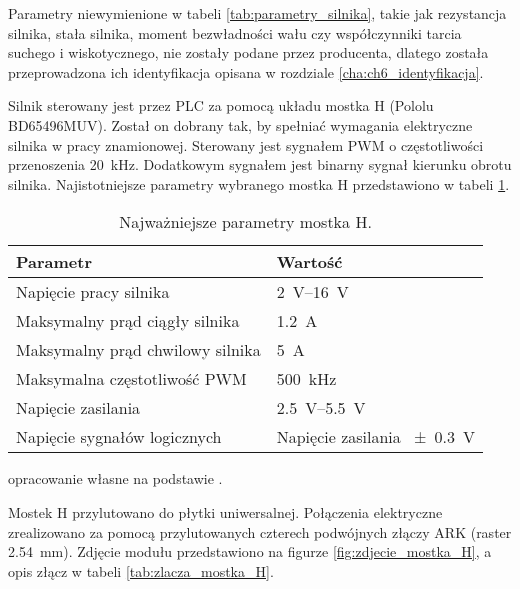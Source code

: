 Parametry niewymienione w tabeli \ref{tab:parametry_silnika}, takie jak rezystancja silnika, stała silnika, moment bezwładności wału czy współczynniki tarcia suchego i wiskotycznego, nie zostały podane przez producenta, dlatego została przeprowadzona ich identyfikacja opisana w rozdziale \ref{cha:ch6_identyfikacja}.

Silnik sterowany jest przez PLC za pomocą układu mostka H (Pololu BD65496MUV). Został on dobrany tak, by spełniać wymagania elektryczne silnika w pracy znamionowej. Sterowany jest sygnałem PWM o częstotliwości przenoszenia \SI{20}{\kilo\hertz}. Dodatkowym sygnałem jest binarny sygnał kierunku obrotu silnika. Najistotniejsze parametry wybranego mostka H przedstawiono w tabeli \ref{tab:parametry_mostka_H}.

\begin{table}[h]
    \centering
    \begin{threeparttable}
        \caption{Najważniejsze parametry mostka H.}
        \label{tab:parametry_mostka_H}
        
        \begin{tabularx}{0.7\textwidth}{l | l}
            \toprule
            Parametr & Wartość \\
            \midrule
            Napięcie pracy silnika & \SIrange{2}{16}{\volt} \\
            Maksymalny prąd ciągły silnika & \SI{1,2}{\ampere} \\
            Maksymalny prąd chwilowy silnika & \SI{5}{\ampere} \\
            Maksymalna częstotliwość PWM & \SI{500}{\kilo\hertz} \\
            Napięcie zasilania & \SIrange{2,5}{5,5}{\volt} \\
            Napięcie sygnałów logicznych & Napięcie zasilania \SI{+-0,3}{\volt} \\
            \bottomrule
        \end{tabularx}
        
        \begin{tablenotes}
            \footnotesize
            \item[a] opracowanie własne na podstawie \cite{MOSTEK_H_MANUAL}.
        \end{tablenotes}
    \end{threeparttable}
\end{table}

Mostek H przylutowano do płytki uniwersalnej. Połączenia elektryczne zrealizowano za pomocą przylutowanych czterech podwójnych złączy ARK (raster \SI{2,54}{\milli\meter}). Zdjęcie modułu przedstawiono na figurze \ref{fig:zdjecie_mostka_H}, a opis złącz w tabeli \ref{tab:zlacza_mostka_H}.

